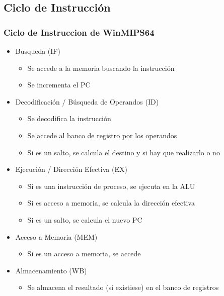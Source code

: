 \documentclass{beamer}
\begin{document}
\subsection{Ciclo de Instrucción}
\begin{frame}
\frametitle{Ciclo de Instruccion de WinMIPS64}
\begin{itemize}
\item Busqueda (IF) 
\begin{itemize}
  \item Se accede a la memoria buscando la instrucción
  \item Se incrementa el PC
\end{itemize}
\item Decodificación / Búsqueda de Operandos (ID)
\begin{itemize}
  \item Se decodifica la instrucción
  \item Se accede al banco de registro por los operandos
  \item Si es un salto, se calcula el destino y si hay que realizarlo o no
\end{itemize}
\item Ejecución / Dirección Efectiva (EX) 
\begin{itemize}
  \item Si es una instrucción de proceso, se ejecuta en la ALU
  \item Si es acceso a memoria, se calcula la dirección efectiva
  \item Si es un salto, se calcula el nuevo PC
\end{itemize}
\item Acceso a Memoria (MEM) 
\begin{itemize}
  \item Si es un acceso a memoria, se accede
\end{itemize}
\item Almacenamiento (WB) 
\begin{itemize}
  \item Se almacena el resultado (si existiese) en el banco de registros
\end{itemize}
\end{itemize}
\end{frame}
\end{document}
